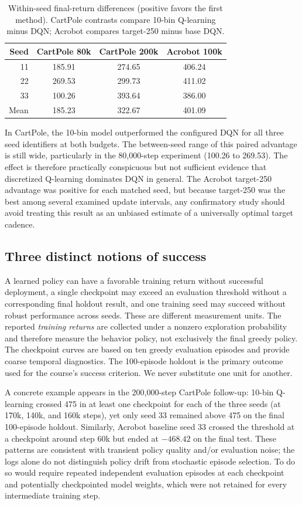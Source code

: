 \documentclass[conference,10pt]{IEEEtran}
\begin{document}
\begin{table}[t]
\caption{Within-seed final-return differences (positive favors the first method). CartPole contrasts compare 10-bin Q-learning minus DQN; Acrobot compares target-250 minus base DQN.}
\label{tab:paired}
\centering\footnotesize\setlength{\tabcolsep}{4pt}
\begin{tabular}{rccc}
\toprule
Seed & CartPole 80k & CartPole 200k & Acrobot 100k \\
\midrule
11 & 185.91 & 274.65 & 406.24 \\
22 & 269.53 & 299.73 & 411.02 \\
33 & 100.26 & 393.64 & 386.00 \\
\midrule
Mean & 185.23 & 322.67 & 401.09 \\
\bottomrule
\end{tabular}
\end{table}

In CartPole, the 10-bin model outperformed the configured DQN for all three seed identifiers at both budgets. The between-seed range of this paired advantage is still wide, particularly in the 80,000-step experiment (100.26 to 269.53). The effect is therefore practically conspicuous but not sufficient evidence that discretized Q-learning dominates DQN in general. The Acrobot target-250 advantage was positive for each matched seed, but because target-250 was the best among several examined update intervals, any confirmatory study should avoid treating this result as an unbiased estimate of a universally optimal target cadence.

\subsection{Three distinct notions of success}
A learned policy can have a favorable training return without successful deployment, a single checkpoint may exceed an evaluation threshold without a corresponding final holdout result, and one training seed may succeed without robust performance across seeds. These are different measurement units. The reported \emph{training returns} are collected under a nonzero exploration probability and therefore measure the behavior policy, not exclusively the final greedy policy. The checkpoint curves are based on ten greedy evaluation episodes and provide coarse temporal diagnostics. The 100-episode holdout is the primary outcome used for the course's success criterion. We never substitute one unit for another.

A concrete example appears in the 200,000-step CartPole follow-up: 10-bin Q-learning crossed 475 in at least one checkpoint for each of the three seeds (at 170k, 140k, and 160k steps), yet only seed 33 remained above 475 on the final 100-episode holdout. Similarly, Acrobot baseline seed 33 crossed the threshold at a checkpoint around step 60k but ended at $-468.42$ on the final test. These patterns are consistent with transient policy quality and/or evaluation noise; the logs alone do not distinguish policy drift from stochastic episode selection. To do so would require repeated independent evaluation episodes at each checkpoint and potentially checkpointed model weights, which were not retained for every intermediate training step.
\end{document}
